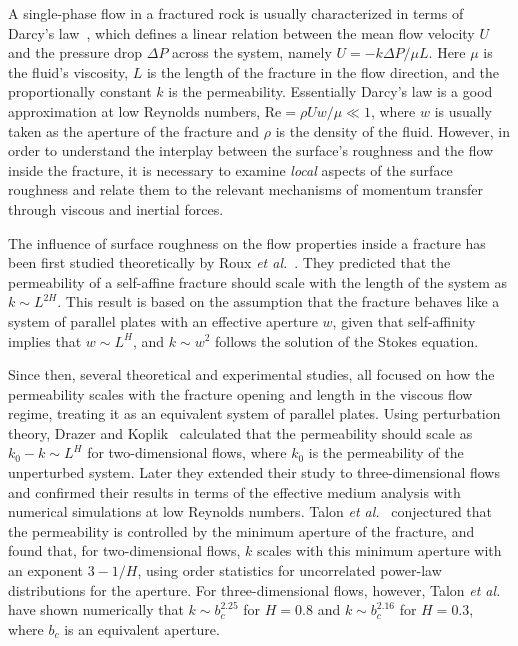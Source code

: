 \documentclass[aps,pre,
superscriptaddress,
twocolumn,
notitlepage,
10pt,]{revtex4-1}
\begin{document}
A single-phase flow in a fractured rock is usually characterized in terms of
Darcy's law~\cite{Sahimi1994,Sahimi2011, Dullien1992}, which defines a linear
relation between the mean flow velocity $ U $ and the pressure drop $\Delta P$
across the system, namely $U = -k \Delta P/\mu L$. Here $\mu$ is the fluid's
viscosity,  $L$ is the length of the fracture in the flow direction, and the
proportionally constant $k$ is the permeability. Essentially Darcy's law is a
good approximation at low Reynolds numbers,
%
$\mathrm{Re} = \rho U w/\mu \ll 1$,
%
where $w$ is usually taken as the aperture of the fracture and $\rho$ is the
density of the fluid. However, in order to understand the interplay between the
surface's roughness and the flow inside the fracture, it is necessary to examine
\emph{local} aspects of the surface roughness and relate them to the relevant
mechanisms of momentum transfer through viscous and inertial forces.

The influence of surface roughness on the flow properties inside a fracture
has been first studied theoretically by Roux \emph{et al.}~\cite{Roux1993}.
They predicted that the permeability of a self-affine fracture should scale
with the length of the system as $k \sim L^{2H}$. This result is based on
the assumption that the fracture behaves like a system of parallel plates
with an effective aperture $w$, given that self-affinity implies that $w
\sim L^H$, and $k \sim w^2$ follows the solution of the Stokes equation.

Since then, several theoretical and experimental studies, all focused on
how the permeability scales with the fracture opening and length in the
viscous flow regime, treating it as an equivalent system of parallel
plates. Using perturbation theory, Drazer and Koplik~\cite{Drazer2000}
calculated that the permeability should scale as $k_0 - k \sim L^H$ for
two-dimensional flows, where $k_0$ is the permeability of the unperturbed
system. Later they extended their study to three-dimensional flows and
confirmed their results in terms of the effective medium analysis with
numerical simulations at low Reynolds numbers.
%
Talon \emph{et al.}~\cite{Talon2010} conjectured that the permeability is
controlled by the minimum aperture of the fracture, and found that, for
two-dimensional flows, $k$ scales with this minimum aperture with an
exponent $3-1/H$, using order statistics for uncorrelated power-law
distributions for the aperture. For three-dimensional flows, however, Talon
\emph{et al.} have shown numerically that $k \sim b_c^{2.25}$ for $H=0.8$
and $k \sim b_c^{2.16}$ for $H=0.3$, where $b_c$ is an equivalent aperture.
\end{document}
